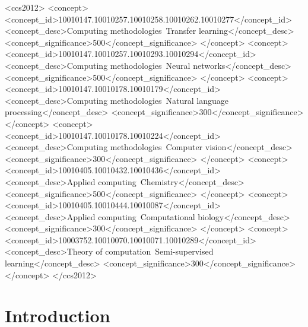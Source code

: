 \documentclass[sigconf]{acmart}
\begin{document}
%
%
\begin{CCSXML}
<ccs2012>
<concept>
<concept_id>10010147.10010257.10010258.10010262.10010277</concept_id>
<concept_desc>Computing methodologies~Transfer learning</concept_desc>
<concept_significance>500</concept_significance>
</concept>
<concept>
<concept_id>10010147.10010257.10010293.10010294</concept_id>
<concept_desc>Computing methodologies~Neural networks</concept_desc>
<concept_significance>500</concept_significance>
</concept>
<concept>
<concept_id>10010147.10010178.10010179</concept_id>
<concept_desc>Computing methodologies~Natural language processing</concept_desc>
<concept_significance>300</concept_significance>
</concept>
<concept>
<concept_id>10010147.10010178.10010224</concept_id>
<concept_desc>Computing methodologies~Computer vision</concept_desc>
<concept_significance>300</concept_significance>
</concept>
<concept>
<concept_id>10010405.10010432.10010436</concept_id>
<concept_desc>Applied computing~Chemistry</concept_desc>
<concept_significance>500</concept_significance>
</concept>
<concept>
<concept_id>10010405.10010444.10010087</concept_id>
<concept_desc>Applied computing~Computational biology</concept_desc>
<concept_significance>300</concept_significance>
</concept>
<concept>
<concept_id>10003752.10010070.10010071.10010289</concept_id>
<concept_desc>Theory of computation~Semi-supervised learning</concept_desc>
<concept_significance>300</concept_significance>
</concept>
</ccs2012>
\end{CCSXML}



\maketitle

\section{Introduction}
\label{sec:intro}
\end{document}
